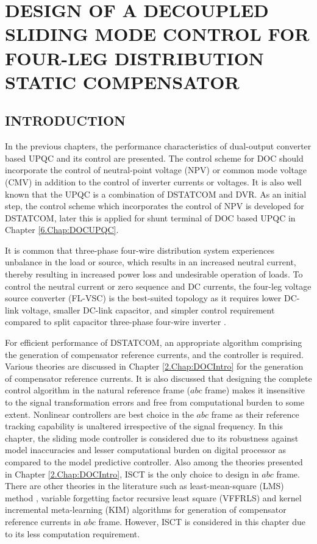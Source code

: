 \chapter{DESIGN OF A DECOUPLED SLIDING MODE CONTROL FOR FOUR-LEG DISTRIBUTION STATIC COMPENSATOR}
\label{4.Chap:DSTATCOM}
\section{INTRODUCTION} 
In the previous chapters, the performance characteristics of dual-output converter based UPQC and its control are presented. The control scheme for DOC should incorporate the control of neutral-point voltage (NPV) or common mode voltage (CMV) in addition to the control of inverter currents or voltages. It is also well known that the UPQC is a combination of DSTATCOM and DVR. As an initial step, the control scheme which incorporates the control of NPV is developed for DSTATCOM, later this is applied for shunt terminal of DOC based UPQC in Chapter \ref{6.Chap:DOCUPQC}. 

It is common that three-phase four-wire distribution system experiences unbalance in the load or source, which results in an increased neutral current, thereby resulting in increased power loss and undesirable operation of loads. To control the neutral current or zero sequence and DC currents, the four-leg voltage source converter (FL-VSC) is the best-suited topology as it requires lower DC-link voltage, smaller DC-link capacitor, and simpler control requirement compared to split capacitor three-phase four-wire inverter \cite{5332351,9183965, 8295220}.

For efficient performance of DSTATCOM, an appropriate algorithm comprising the generation of compensator reference currents, and the controller is required. Various theories are discussed in Chapter \ref{2.Chap:DOCIntro} for the generation of compensator reference currents. It is also discussed that designing the complete control algorithm in the natural reference frame ($abc$ frame) makes it insensitive to the signal transformation errors and free from computational burden to some extent. Nonlinear controllers are best choice in the $abc$ frame as their reference tracking capability is unaltered irrespective of the signal frequency. In this chapter, the sliding mode controller is considered due to its robustness against model inaccuracies and lesser computational burden on digital processor as compared to the model predictive controller.  Also among the theories presented in Chapter \ref{2.Chap:DOCIntro}, ISCT is the only choice to design in $abc$ frame. There are other theories in the literature such as least-mean-square (LMS) method \cite{9183965,9516846}, variable forgetting factor recursive least square (VFFRLS) \cite{7084175} and kernel incremental meta-learning (KIM) \cite{6782746} algorithms for generation of compensator reference currents in $abc$ frame. However, ISCT is considered in this chapter due to its less computation requirement.

